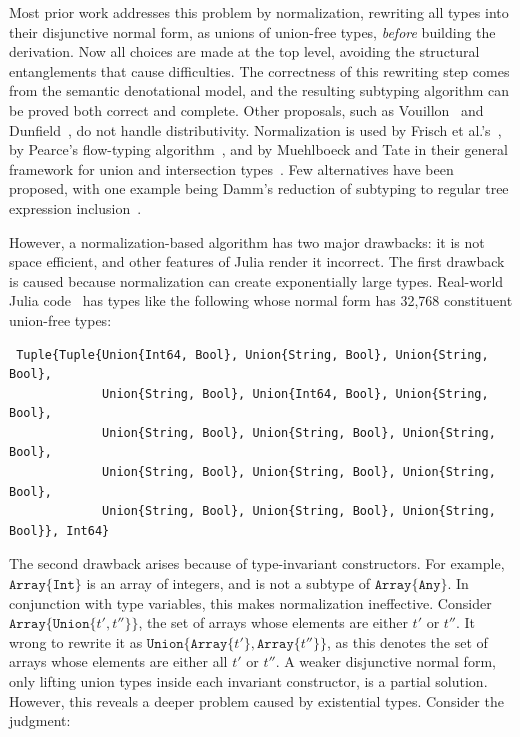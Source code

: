 \documentclass[a4paper,english]{lipics-v2019}
\newcommand{\xt}[1]{\texttt{#1}}
\newcommand{\union}[2]{\xt{Union\{}#1,#2\xt{\}}}
\newcommand{\arrayt}[1]{\xt{Array\{}#1\xt{\}}}
\begin{document}
Most prior work addresses this problem by normalization\cite{barbanera1991intersection,Pierce1991,aiken1991implementing},  
rewriting all types into their disjunctive normal form,
as unions of union-free types, \emph{before} building the derivation. Now all
choices are made at the top level, avoiding the structural entanglements that
cause difficulties. The correctness of this rewriting step comes from the semantic
denotational model, and the resulting subtyping algorithm can be proved both
correct and complete.
Other proposals, such as Vouillon~\cite{Vouillon04} and Dunfield~\cite{DBLP:journals/jfp/Dunfield14}, do not handle distributivity. 
Normalization is used
by Frisch et al.'s~\cite{Frisch08}, by Pearce's
flow-typing algorithm~\cite{DBLP:conf/vmcai/Pearce13}, and by
Muehlboeck and Tate in their general framework for union and intersection
types~\cite{muehlboeck2018empowering}. Few alternatives have been proposed, with
one example being Damm's reduction of subtyping to regular tree
expression inclusion~\cite{DBLP:conf/tacs/Damm94}. 

However, a normalization-based algorithm has two major drawbacks: it is not
space efficient, and other features of Julia render it incorrect.  The first
drawback is caused because normalization can create exponentially large
types. Real-world Julia code~\cite{DBLP:NardelliBPCBV18} has types like the
following whose normal form has 32,768 constituent union-free types:

\vspace{-2mm}
\begin{small}
\begin{verbatim}
 Tuple{Tuple{Union{Int64, Bool}, Union{String, Bool}, Union{String, Bool}, 
             Union{String, Bool}, Union{Int64, Bool}, Union{String, Bool}, 
             Union{String, Bool}, Union{String, Bool}, Union{String, Bool}, 
             Union{String, Bool}, Union{String, Bool}, Union{String, Bool}, 
             Union{String, Bool}, Union{String, Bool}, Union{String, Bool}}, Int64}
\end{verbatim}
\end{small}
\vspace{-2mm}

\noindent
The second drawback arises because of type-invariant constructors. For
example, $\arrayt{\xt{Int}}$ is an array of integers, and is not a subtype
of $\arrayt{\xt{Any}}$. In conjunction with type variables, this makes
normalization ineffective.  Consider {\small \(\arrayt{\union{t'}{t''}}\)},
the set of arrays whose elements are either {\small $t'$} or {\small $t''$}.
It wrong to rewrite it as {\small \(\union{\arrayt{t'}}{\arrayt{t''}}\)}, as
this denotes the set of arrays whose elements are either all {\small $t'$}
or {\small$t''$}. A weaker disjunctive normal form, only lifting union types
inside each invariant constructor, is a partial solution.  However, this
reveals a deeper problem caused by existential types. Consider the judgment:
\end{document}
